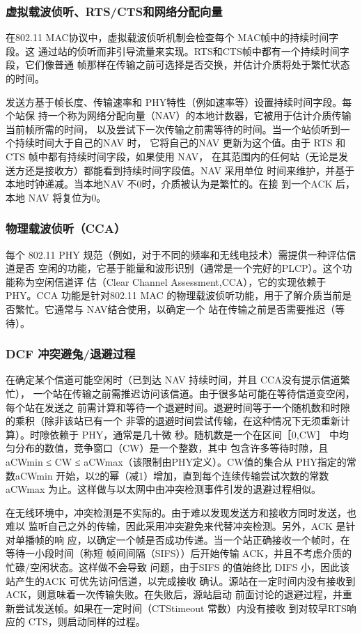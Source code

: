 \subsubsection{虚拟载波侦听、RTS/CTS和网络分配向量}

在802.11 MAC协议中，虚拟载波侦听机制会检查每个 MAC帧中的持续时间字段。这
通过站的侦听而非引导流量来实现。RTS和CTS帧中都有一个持续时间字段，它们像普通
帧那样在传输之前可选择是否交换，并估计介质将处于繁忙状态的时间。

发送方基于帧长度、传输速率和 PHY特性（例如速率等）设置持续时间字段。每个站保
持一个称为网络分配向量（NAV）的本地计数器，它被用于估计介质传输当前帧所需的时间，
以及尝试下一次传输之前需等待的时间。当一个站侦听到一个持续时间大于自己的NAV 时，
它将自己的NAV 更新为这个值。由于 RTS 和 CTS 帧中都有持续时间字段，如果使用 NAV，
在其范围内的任何站（无论是发送方还是接收方）都能看到持续时间字段值。NAV 采用单位
时间来维护，并基于本地时钟递减。当本地NAV 不0时，介质被认为是繁忙的。在接
到一个ACK 后，本地 NAV 将复位为0。

\subsubsection{物理载波侦听（CCA）}

每个 802.11 PHY 规范（例如，对于不同的频率和无线电技术）需提供一种评估信道是否
空闲的功能，它基于能量和波形识别（通常是一个完好的PLCP）。这个功能称为空闲信道评
估（Clear Channel Assessment,CCA），它的实现依赖于 PHY。CCA 功能是针对802.11 MAC
的物理载波侦听功能，用于了解介质当前是否繁忙。它通常与 NAV结合使用，以确定一个
站在传输之前是否需要推迟（等待）。

\subsubsection{DCF 冲突避兔/退避过程}

在确定某个信道可能空闲时（已到达 NAV 持续时间，并且 CCA没有提示信道繁忙），
一个站在传输之前需推迟访问该信道。由于很多站可能在等待信道变空闲，每个站在发送之
前需计算和等待一个退避时间。退避时间等于一个随机数和时隙的乘积（除非该站已有一个
非零的退避时间尝试传输，在这种情况下无须重新计算）。时隙依赖于 PHY，通常是几十微
秒。随机数是一个在区间［0,CW］ 中均匀分布的数值，竞争窗口（CW）是一个整数，其中
包含许多等待时隙，且aCWmin ≤ CW ≤ aCWmax（该限制由PHY定义）。CW值的集合从
PHY指定的常数aCWmin 开始，以2的幂（减1）增加，直到每个连续传输尝试次数的常数
aCWmax 为止。这样做与以太网中由冲突检测事件引发的退避过程相似。

在无线环境中，冲突检测是不实际的。由于难以发现发送方和接收方同时发送，也难以
监听自己之外的传输，因此采用冲突避免来代替冲突检测。另外，ACK 是针对单播帧的响
应，以确定一个帧是否成功传递。当一个站正确接收一个帧时，在等待一小段时间（称短
帧间间隔（SIFS））后开始传输 ACK，并且不考虑介质的忙碌/空闲状态。这样做不会导致
问题，由于SIFS 的值始终比 DIFS 小，因此该站产生的ACK 可优先访问信道，以完成接收
确认。源站在一定时间内没有接收到ACK，则意味着一次传输失败。在失败后，源站启动
前面讨论的退避过程，并重新尝试发送帧。如果在一定时间（CTStimeout 常数）内没有接收
到对较早RTS响应的 CTS，则启动同样的过程。

